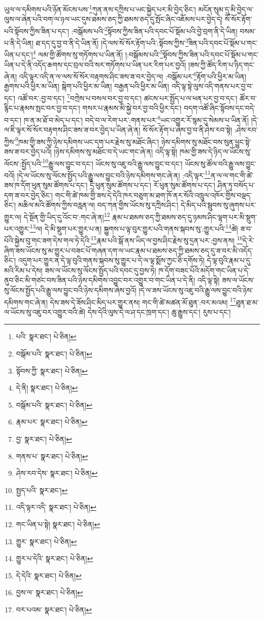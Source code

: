 ཡུལ་ལ་དམིགས་པའི་ཉོན་མོངས་པས་\footnote{པའི་  སྣར་ཐང་།  པེ་ཅིན། }ཀུན་ནས་དཀྲིས་པ་ཡང་སྐྱེད་པར་མི་བྱེད་ཅིང་། མངོན་སུམ་དུ་མི་བྱེད་ལ་ལུས་ལ་ཞེན་པའི་བག་ལ་ཉལ་ཡང་དུས་ཐམས་ཅད་ཀྱི་ཐམས་ཅད་དུ་སྤོང་ཞིང་འཇོམས་པར་བྱེད་དེ། སོ་སོར་རྟོག་པའི་སྟོབས་ཀྱིས་ཟིན་པ་དང་། :བསྒོམས་པའི་\footnote{བསྒོམ་པའི་  སྣར་ཐང་།  པེ་ཅིན། }སྟོབས་ཀྱིས་ཟིན་པའི་དབང་པོ་སྡོམ་པའི་བྱེ་བྲག་ནི་དེ་ཡིན། བསམ་པ་ནི་དེ་ཡིན། ཐ་དད་དུ་བྱ་བ་ནི་དེ་ཡིན་ནོ། །དེ་ལས་སོ་སོར་རྟོག་པའི་:སྟོབས་ཀྱིས་\footnote{སྟོབས་ཀྱི་  སྣར་ཐང་།  པེ་ཅིན། }ཟིན་པའི་དབང་པོ་སྡོམ་པ་གང་ཡིན་པ་དང་།\footnote{དེ་ནི།  སྣར་ཐང་།  པེ་ཅིན། } ལམ་གྱི་ཚོགས་སུ་གཏོགས་པ་ཡིན་ནོ། །:བསྒོམས་པའི་\footnote{བསྒོམ་པའི་  སྣར་ཐང་།  པེ་ཅིན། }སྟོབས་ཀྱིས་ཟིན་པའི་དབང་པོ་སྡོམ་པ་གང་ཡིན་པ་དེ་ནི་འདོད་ཆགས་དང་བྲལ་བའི་སར་གཏོགས་པ་ཡིན་པར་རིག་པར་བྱའོ། །ཟས་ཀྱི་ཚོད་རིག་པ་ཉིད་གང་ཞེ་ན། འདི་ལྟར་འདི་ན་ལ་ལས་སོ་སོར་བརྟགས་ཤིང་ཟས་ཟ་བར་བྱེད་ལ། :བསྒོམ་པར་\footnote{རྣམ་པར་  སྣར་ཐང་།  པེ་ཅིན། }རྟོག་པའི་ཕྱིར་མ་ཡིན། རྒྱགས་པའི་ཕྱིར་མ་ཡིན། སྒེག་པའི་ཕྱིར་མ་ཡིན། བརྒྱན་པའི་ཕྱིར་མ་ཡིན། འདི་ལྟ་སྟེ་ལུས་འདི་གནས་པར་བྱ་བ་དང་། འཚོ་བར་:བྱ་བ་དང་། \footnote{བྱ་  སྣར་ཐང་།  པེ་ཅིན། }བཀྲེས་པ་བསལ་བར་བྱ་བ་དང་། ཚངས་པར་སྤྱོད་པ་ལ་ཕན་པར་བྱ་བ་དང་། ཚོར་བ་རྙིང་པ་རྣམས་སྤང་བར་བྱ་བ་དང་། གསར་པ་རྣམས་མི་སྐྱེ་བར་བྱ་བའི་ཕྱིར་དང་། བདག་འཚོ་ཞིང་སྟོབས་དང་བདེ་བ་དང་། ཁ་ན་མ་ཐོ་བ་མེད་པ་དང་། བདེ་བ་ལ་རེག་པར་:གནས་པར་\footnote{གནས་པ་  སྣར་ཐང་།  པེ་ཅིན། }ཡང་འགྱུར་རོ་སྙམ་དུ་སེམས་པ་ཡིན་ནོ། །དེ་ལ་ཇི་ལྟར་སོ་སོར་བརྟགས་ཤིང་ཟས་ཟ་བར་བྱེད་པ་ཡིན་ཞེ་ན། སོ་སོར་རྟོག་པ་ཞེས་བྱ་བ་ནི་ཤེས་རབ་སྟེ། :ཤེས་རབ་ཀྱིས་\footnote{ཤེས་རབ་དེས་  སྣར་ཐང་།  པེ་ཅིན། }ཁམ་གྱི་ཟས་ཀྱི་ཉེས་དམིགས་ཡང་དག་པར་རྗེས་སུ་མཐོང་ཞིང་། ཉེས་དམིགས་སུ་མཐོང་བས་སུན་ཕྱུང་སྟེ་ཟས་ཟ་བར་བྱེད་པའོ། །ཉེས་དམིགས་སུ་མཐོང་བ་དེ་ཡང་གང་ཞེ་ན། འདི་ལྟ་སྟེ། ཁམ་གྱི་ཟས་དེ་ཉིད་ལ་ཡོངས་སུ་ལོངས་:སྤྱོད་པའི་\footnote{སྤྱད་པའི་  སྣར་ཐང་། }རྒྱུ་ལས་བྱུང་བ་དང་། ཡོངས་སུ་འཇུ་བའི་རྒྱུ་ལས་བྱུང་བ་དང་། ཡོངས་སུ་ཚོལ་བའི་རྒྱུ་ལས་བྱུང་བའོ། །དེ་ལ་ཡོངས་སུ་ལོངས་སྤྱོད་པའི་རྒྱུ་ལས་བྱུང་བའི་ཉེས་དམིགས་གང་ཞེ་ན། :འདི་ལྟར་\footnote{འདི་ལྟར་འདི་  སྣར་ཐང་།  པེ་ཅིན། }ན་ལ་ལ་གང་གི་ཚེ་ཟས་ཁ་དོག་ཕུན་སུམ་ཚོགས་པ་དང་། དྲི་ཕུན་སུམ་ཚོགས་པ་དང་། རོ་ཕུན་སུམ་ཚོགས་པ་དང་། ཤིན་ཏུ་བསོད་པ་དག་ཟ་བར་བྱེད་ཅིང་། གང་གི་ཚེ་ཁམ་གྱི་ཟས་དེ་དེའི་ཁར་བཅུག་མ་ཐག་ཁོ་ནར་སོའི་འཁྲུལ་འཁོར་གྱིས་བལྡད་ཅིང་། མཆིལ་མའི་ཚོགས་ཀྱིས་བརླན་ལ། བད་ཀན་གྱིས་ཡོངས་སུ་དཀྲིས་ཤིང་། དེ་མིད་པའི་སྦུབས་སུ་ཞུགས་པར་གྱུར་ལ། དེ་སྔོན་གྱི་ཡིད་དུ་འོང་བ་:གང་ཞེ་ན།\footnote{གང་ཡིན་པ་སྟེ།  སྣར་ཐང་།  པེ་ཅིན། } རྣམ་པ་ཐམས་ཅད་ཀྱི་ཐམས་ཅད་དུ་ཉམས་ཤིང་ལྷག་པར་མི་སྡུག་པར་འགྱུར་\footnote{གྱུར་  སྣར་ཐང་།  པེ་ཅིན། }ལ། དེ་མི་སྡུག་པར་གྱུར་པ་ན། སྐྱུགས་པ་ལྟ་བུར་གྱུར་པའི་གནས་སྐབས་སུ་:གྱུར་པའི་\footnote{གྱུར་པ་དེའི་  སྣར་ཐང་།  པེ་ཅིན། }ཚེ། ཟ་བ་པོའི་སྐྱེས་བུ་གང་ཟག་དེས་གལ་ཏེ་དེའི་\footnote{དེ་དེའི་  སྣར་ཐང་།  པེ་ཅིན། }རྣམ་པའི་སྒོ་ནས་ཡིད་ལ་བྱས་ཤིང་རྗེས་སུ་དྲན་པར་:བྱས་ནས། \footnote{བྱས་ལ་  སྣར་ཐང་།  པེ་ཅིན། }དེ་རེ་ཞིག་ཟས་ཡོངས་སུ་མ་གྱུར་པ་བཟང་པོ་གཞན་དག་ལ་ཡང་རྣམ་པ་ཐམས་ཅད་ཀྱི་ཐམས་ཅད་དུ་ཟ་བར་མི་འདོད་ཅིང་། འདུག་པར་གྱུར་ན་དེ་ལྟ་བུའི་གནས་སྐབས་སུ་གྱུར་པ་དེ་ལ་ལྟ་སྨོས་ཀྱང་ཅི་དགོས་ཏེ། དེ་ལྟ་བུའི་རྣམ་པ་དུ་མའི་རིམ་པ་དེས། ཟས་ལ་ཡོངས་སུ་ལོངས་སྤྱོད་པའི་དབང་དུ་བྱས་ཏེ། ཁ་དོག་བཟང་པོའི་མདོག་གང་ཡིན་པ་དེ་ནུབ་ཅིང་མི་གཙང་བས་ཟིན་པའི་ཉེས་དམིགས་འབྱུང་བར་འགྱུར་བ་གང་ཡིན་པ་དེ་ནི། འདི་ལྟ་སྟེ། ཟས་ལ་ཡོངས་སུ་ལོངས་སྤྱོད་པའི་རྒྱུ་ལས་བྱུང་བའི་ཉེས་དམིགས་ཞེས་བྱའོ། །དེ་ལ་ཟས་ཡོངས་སུ་འཇུ་བའི་རྒྱུ་ལས་བྱུང་བའི་ཉེས་དམིགས་གང་ཞེ་ན། དེས་ཟས་དེ་ཟོས་ཤིང་མིད་པར་གྱུར་ནས། གང་གི་ཚེ་མཚན་མོ་ཐུན་:བར་མའམ། \footnote{བར་པའམ་  སྣར་ཐང་།  པེ་ཅིན། }ཐུན་ཐ་མ་ལ་ཡོངས་སུ་འཇུ་བར་འགྱུར་བའི་ཚེ། དེས་དེའི་ལུས་དེ་ལ་ཤ་དང་ཁྲག་དང་། ཆུ་རྒྱུས་དང་། རུས་པ་དང་། 